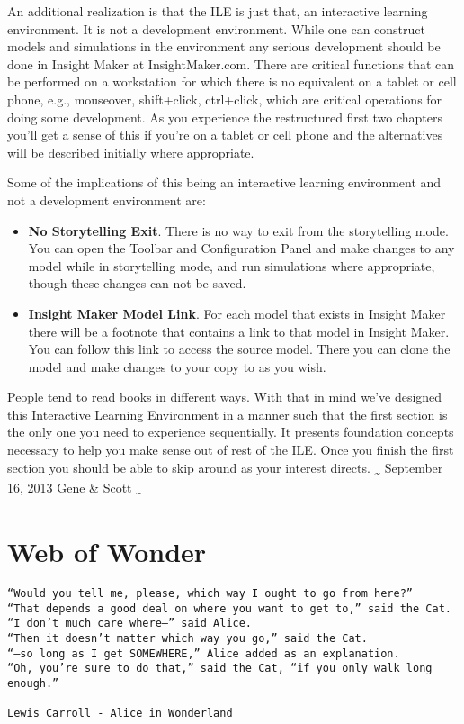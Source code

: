 \documentclass[]{memoir}
\begin{document}
An additional realization is that the ILE is just that, an interactive
learning environment. It is not a development environment. While one can
construct models and simulations in the environment any serious
development should be done in Insight Maker at InsightMaker.com. There
are critical functions that can be performed on a workstation for which
there is no equivalent on a tablet or cell phone, e.g., mouseover,
shift+click, ctrl+click, which are critical operations for doing some
development. As you experience the restructured first two chapters
you'll get a sense of this if you're on a tablet or cell phone and the
alternatives will be described initially where appropriate.

Some of the implications of this being an interactive learning
environment and not a development environment are:

\begin{itemize}
\itemsep1pt\parskip0pt
\item
  \textbf{No Storytelling Exit}. There is no way to exit from the
  storytelling mode. You can open the Toolbar and Configuration Panel
  and make changes to any model while in storytelling mode, and run
  simulations where appropriate, though these changes can not be saved.
\item
  \textbf{Insight Maker Model Link}. For each model that exists in
  Insight Maker there will be a footnote that contains a link to that
  model in Insight Maker. You can follow this link to access the source
  model. There you can clone the model and make changes to your copy to
  as you wish.
\end{itemize}

People tend to read books in different ways. With that in mind we've
designed this Interactive Learning Environment in a manner such that the
first section is the only one you need to experience sequentially. It
presents foundation concepts necessary to help you make sense out of
rest of the ILE. Once you finish the first section you should be able to
skip around as your interest directs. \textsubscript{\textasciitilde{}}
September 16, 2013 Gene \& Scott \textsubscript{\textasciitilde{}}

\chapter{Web of Wonder}

\begin{lstlisting}
“Would you tell me, please, which way I ought to go from here?”
“That depends a good deal on where you want to get to,” said the Cat.
“I don’t much care where–” said Alice.
“Then it doesn’t matter which way you go,” said the Cat.
“–so long as I get SOMEWHERE,” Alice added as an explanation.
“Oh, you’re sure to do that,” said the Cat, “if you only walk long enough.”

Lewis Carroll - Alice in Wonderland
\end{lstlisting}
\end{document}
